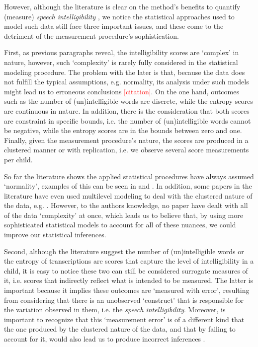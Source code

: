 However, although the literature is clear on the method's benefits to quantify (measure) \textit{speech intelligibility} \cite{Boonen_et_al_2020, Boonen_et_al_2021, Hustad_et_al_2020}, we notice the statistical approaches used to model such data still face three important issues, and these come to the detriment of the measurement procedure's sophistication. 

First, as previous paragraphs reveal, the intelligibility scores are `complex' in nature, however, such `complexity' is rarely fully considered in the statistical modeling procedure. The problem with the later is that, because the data does not fulfill the typical assumptions, e.g. normality, its analysis under such models might lead us to erroneous conclusions \textcolor{red}{[citation]}. On the one hand, outcomes such as the number of (un)intelligible words are discrete, while the entropy scores are continuous in nature. In addition, there is the consideration that both scores are constraint in specific bounds, i.e. the number of (un)intelligible words cannot be negative, while the entropy scores are in the bounds between zero and one. Finally, given the measurement procedure's nature, the scores are produced in a clustered manner or with replication, i.e. we observe several score measurements per child. 

So far the literature shows the applied statistical procedures have always assumed `normality', examples of this can be seen in \citet{Boonen_et_al_2021, Flipsen_et_al_2006} and \citet{Hustad_et_al_2020}. In addition, some papers in the literature have even used multilevel modeling to deal with the clustered nature of the data, e.g. \citet{Boonen_et_al_2021}. However, to the authors knowledge, no paper have dealt with all of the data `complexity' at once, which leads us to believe that, by using more sophisticated statistical models to account for all of these nuances, we could improve our statistical inferences. 

Second, although the literature suggest the number of (un)intelligible words or the entropy of transcriptions are scores that capture the level of intelligibility in a child, it is easy to notice these two can still be considered surrogate measures of it, i.e. scores that indirectly reflect what is intended to be measured. The latter is important because it implies these outcomes are `measured with error', resulting from considering that there is an unobserved `construct' that is responsible for the variation observed in them, i.e. the \textit{speech intelligibility}. Moreover, is important to recognize that this `measurement error' is of a different kind that the one produced by the clustered nature of the data, and that by failing to account for it, would also lead us to produce incorrect inferences \cite{deHaan_et_al_2019}.

